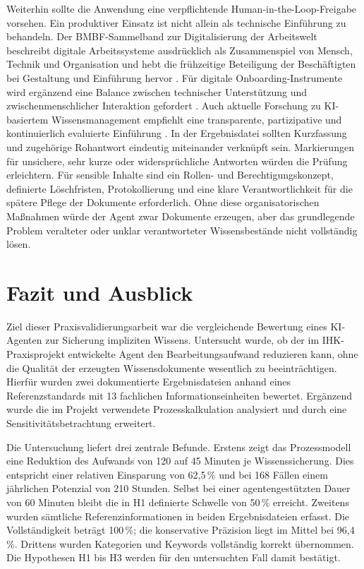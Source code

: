 \documentclass[
  10pt,
  ngerman,
  a4paper,
  toc=graduated,
  numbers=noenddot,
  headings=standardclasses,
  nonumberlist
]{scrartcl}
\newcommand{\pct}[1]{#1\,\%}
\begin{document}
Weiterhin sollte die Anwendung eine verpflichtende Human-in-the-Loop-Freigabe vorsehen. Ein produktiver Einsatz ist nicht allein als technische Einführung zu behandeln. Der BMBF-Sammelband zur Digitalisierung der Arbeitswelt beschreibt digitale Arbeitssysteme ausdrücklich als Zusammenspiel von Mensch, Technik und Organisation und hebt die frühzeitige Beteiligung der Beschäftigten bei Gestaltung und Einführung hervor \cite[S.~4--6, 10--11]{boehme_nedz_2023}. Für digitale Onboarding-Instrumente wird ergänzend eine Balance zwischen technischer Unterstützung und zwischenmenschlicher Interaktion gefordert \cite[S.~143--145]{sander_onboarding_2023}. Auch aktuelle Forschung zu KI-basiertem Wissensmanagement empfiehlt eine transparente, partizipative und kontinuierlich evaluierte Einführung \cite[S.~77--110]{nicole_ottersbock_wissensmanagement_2026}. In der Ergebnisdatei sollten Kurzfassung und zugehörige Rohantwort eindeutig miteinander verknüpft sein. Markierungen für unsichere, sehr kurze oder widersprüchliche Antworten würden die Prüfung erleichtern. Für sensible Inhalte sind ein Rollen- und Berechtigungskonzept, definierte Löschfristen, Protokollierung und eine klare Verantwortlichkeit für die spätere Pflege der Dokumente erforderlich. Ohne diese organisatorischen Maßnahmen würde der Agent zwar Dokumente erzeugen, aber das grundlegende Problem veralteter oder unklar verantworteter Wissensbestände nicht vollständig lösen.

\section{Fazit und Ausblick}

Ziel dieser Praxisvalidierungsarbeit war die vergleichende Bewertung eines KI-Agenten zur Sicherung impliziten Wissens. Untersucht wurde, ob der im IHK-Praxisprojekt entwickelte Agent den Bearbeitungsaufwand reduzieren kann, ohne die Qualität der erzeugten Wissensdokumente wesentlich zu beeinträchtigen. Hierfür wurden zwei dokumentierte Ergebnisdateien anhand eines Referenzstandards mit 13 fachlichen Informationseinheiten bewertet. Ergänzend wurde die im Projekt verwendete Prozesskalkulation analysiert und durch eine Sensitivitätsbetrachtung erweitert.

Die Untersuchung liefert drei zentrale Befunde. Erstens zeigt das Prozessmodell eine Reduktion des Aufwands von 120 auf 45 Minuten je Wissenssicherung. Dies entspricht einer relativen Einsparung von \pct{62{,}5} und bei 168 Fällen einem jährlichen Potenzial von 210 Stunden. Selbst bei einer agentengestützten Dauer von 60 Minuten bleibt die in H1 definierte Schwelle von \pct{50} erreicht. Zweitens wurden sämtliche Referenzinformationen in beiden Ergebnisdateien erfasst. Die Vollständigkeit beträgt \pct{100}; die konservative Präzision liegt im Mittel bei \pct{96{,}4}. Drittens wurden Kategorien und Keywords vollständig korrekt übernommen. Die Hypothesen H1 bis H3 werden für den untersuchten Fall damit bestätigt.
\end{document}
